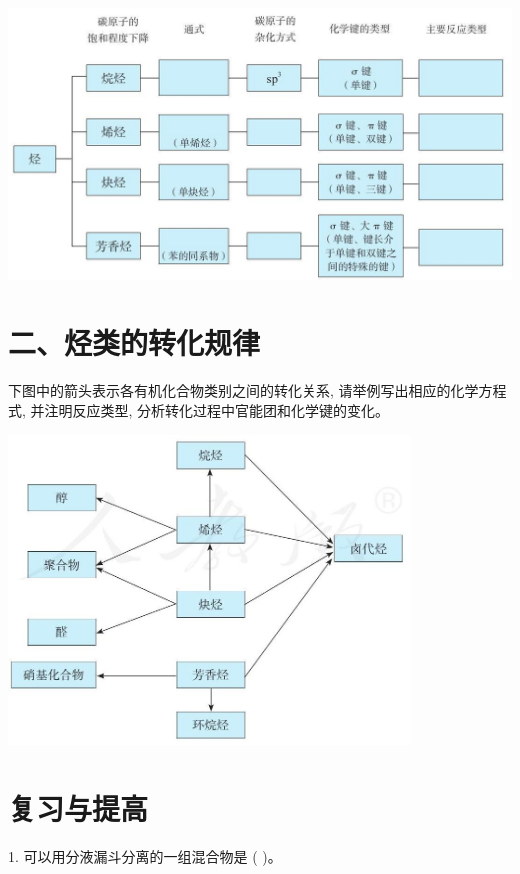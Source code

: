\documentclass[10pt]{article}
\begin{document}
\begin{center}
\includegraphics[max width=1.0\textwidth]{images/0190efc5-b58a-7c43-bfb0-e0a030df9cfd_55_114844.jpg}
\end{center}

\section*{二、烃类的转化规律}

下图中的箭头表示各有机化合物类别之间的转化关系, 请举例写出相应的化学方程式, 并注明反应类型, 分析转化过程中官能团和化学键的变化。

\begin{center}
\includegraphics[max width=0.8\textwidth]{images/0190efc5-b58a-7c43-bfb0-e0a030df9cfd_55_556653.jpg}
\end{center}

\section*{复习与提高}

1. 可以用分液漏斗分离的一组混合物是 ( )。
\end{document}
